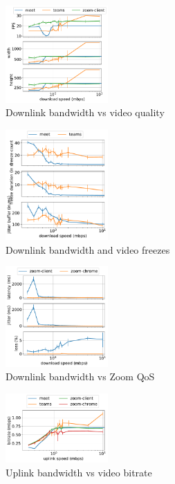\begin{figure}[]
    \includegraphics[width=0.35\textwidth,keepaspectratio]{figures/static/downlink_video_qual_meet_teams_zoom.pdf}
    \caption{Downlink bandwidth vs video quality}
    \label{fig:downlink_video_qual}
\end{figure}


\begin{figure}[]
    \includegraphics[width=0.35\textwidth,keepaspectratio]{figures/static/downlink_freeze_meet_teams.pdf}
    \caption{Downlink bandwidth and video freezes}
    \label{fig:downlink_freeze}
\end{figure}


\begin{figure}[]
    \includegraphics[width=0.35\textwidth,keepaspectratio]{figures/static/downlink_qos_zoom.pdf}
    \caption{Downlink bandwidth vs Zoom QoS}
    \label{fig:downlink_qos_zoom}
\end{figure}


\begin{figure}[]
    \includegraphics[width=0.35\textwidth,keepaspectratio]{figures/static/uplink_bitrate_meet_teams_zoom.pdf}
    \caption{Uplink bandwidth vs video bitrate}
    \label{fig:uplink_qos}
\end{figure}


